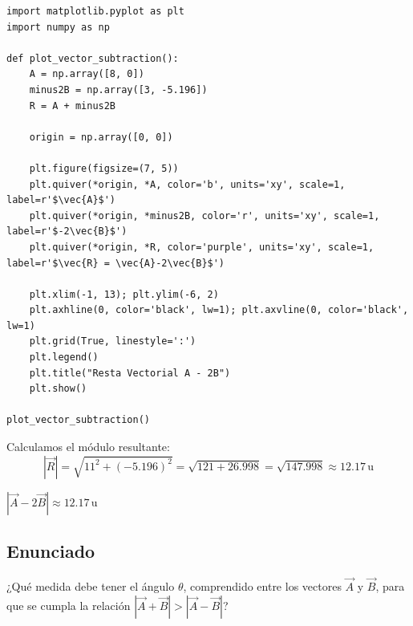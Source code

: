 \documentclass[12pt, a4paper]{article}
\begin{document}
\begin{lstlisting}
import matplotlib.pyplot as plt
import numpy as np

def plot_vector_subtraction():
    A = np.array([8, 0])
    minus2B = np.array([3, -5.196])
    R = A + minus2B
    
    origin = np.array([0, 0])
    
    plt.figure(figsize=(7, 5))
    plt.quiver(*origin, *A, color='b', units='xy', scale=1, label=r'$\vec{A}$')
    plt.quiver(*origin, *minus2B, color='r', units='xy', scale=1, label=r'$-2\vec{B}$')
    plt.quiver(*origin, *R, color='purple', units='xy', scale=1, label=r'$\vec{R} = \vec{A}-2\vec{B}$')
    
    plt.xlim(-1, 13); plt.ylim(-6, 2)
    plt.axhline(0, color='black', lw=1); plt.axvline(0, color='black', lw=1)
    plt.grid(True, linestyle=':')
    plt.legend()
    plt.title("Resta Vectorial A - 2B")
    plt.show()

plot_vector_subtraction()
\end{lstlisting}

Calculamos el módulo resultante:
\begin{equation*}
    |\vec{R}| = \sqrt{11^2 + (-5.196)^2} = \sqrt{121 + 26.998} = \sqrt{147.998} \approx 12.17 \, \text{u}
\end{equation*}

\begin{tcolorbox}[colback=green!5!white, colframe=green!50!black, title=Respuesta Final]
\centering \Large $|\vec{A} - 2\vec{B}| \approx 12.17 \, \text{u}$
\end{tcolorbox}

\newpage

\subsection*{Enunciado}
¿Qué medida debe tener el ángulo $\theta$, comprendido entre los vectores $\vec{A}$ y $\vec{B}$, para que se cumpla la relación $|\vec{A} + \vec{B}| > |\vec{A} - \vec{B}|$?

\begin{center}
\end{center}
\end{document}
